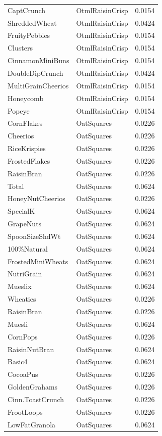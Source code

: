 \begin{longtable}{llr}
CaptCrunch & OtmlRaisinCrisp & 0.0154 \\
ShreddedWheat & OtmlRaisinCrisp & 0.0424 \\
FruityPebbles & OtmlRaisinCrisp & 0.0154 \\
Clusters & OtmlRaisinCrisp & 0.0154 \\
CinnamonMiniBuns & OtmlRaisinCrisp & 0.0154 \\
DoubleDipCrunch & OtmlRaisinCrisp & 0.0424 \\
MultiGrainCheerios & OtmlRaisinCrisp & 0.0154 \\
Honeycomb & OtmlRaisinCrisp & 0.0154 \\
Popeye & OtmlRaisinCrisp & 0.0154 \\
CornFlakes & OatSquares & 0.0226 \\
Cheerios & OatSquares & 0.0226 \\
RiceKrispies & OatSquares & 0.0226 \\
FrostedFlakes & OatSquares & 0.0226 \\
RaisinBran & OatSquares & 0.0226 \\
Total & OatSquares & 0.0624 \\
HoneyNutCheerios & OatSquares & 0.0226 \\
SpecialK & OatSquares & 0.0624 \\
GrapeNuts & OatSquares & 0.0624 \\
SpoonSizeShdWt & OatSquares & 0.0624 \\
100\%Natural & OatSquares & 0.0624 \\
FrostedMiniWheats & OatSquares & 0.0624 \\
NutriGrain & OatSquares & 0.0624 \\
Mueslix & OatSquares & 0.0624 \\
Wheaties & OatSquares & 0.0226 \\
RaisinBran & OatSquares & 0.0226 \\
Muesli & OatSquares & 0.0624 \\
CornPops & OatSquares & 0.0226 \\
RaisinNutBran & OatSquares & 0.0624 \\
Basic4 & OatSquares & 0.0624 \\
CocoaPus & OatSquares & 0.0226 \\
GoldenGrahams & OatSquares & 0.0226 \\
Cinn.ToastCrunch & OatSquares & 0.0226 \\
FrootLoops & OatSquares & 0.0226 \\
LowFatGranola & OatSquares & 0.0624 \\

\end{longtable}
